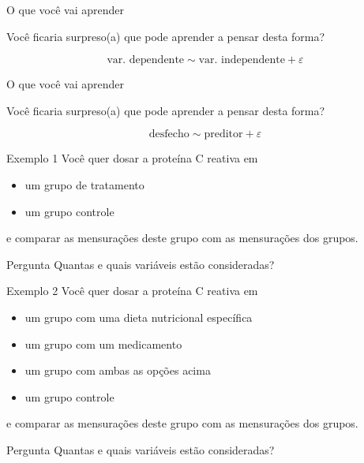 \documentclass{beamer}
\begin{document}
\begin{frame}{O que você vai aprender}
  \begin{block}{}
    Você ficaria surpreso(a) que pode aprender a pensar desta forma?
  \end{block}

  $$\text{var. dependente} \sim \text{var. independente} + \varepsilon$$
\end{frame}

\begin{frame}{O que você vai aprender}
  \begin{block}{}
    Você ficaria surpreso(a) que pode aprender a pensar desta forma?
  \end{block}

  $$\text{desfecho} \sim \text{preditor} + \varepsilon$$
\end{frame}

\begin{frame}{}
  \begin{exampleblock}{Exemplo 1}
    Você quer dosar a proteína C reativa em
    \begin{itemize}
    \item um grupo de tratamento
    \item um grupo controle
    \end{itemize}
    e comparar as mensurações deste grupo com as mensurações dos grupos.
  \end{exampleblock}
  \begin{block}{Pergunta}
    Quantas e quais variáveis estão consideradas?
  \end{block}
\end{frame}

\begin{frame}{}
  \begin{exampleblock}{Exemplo 2}
    Você quer dosar a proteína C reativa em
    \begin{itemize}
    \item um grupo com uma dieta nutricional específica
    \item um grupo com um medicamento
    \item um grupo com ambas as opções acima
    \item um grupo controle
    \end{itemize}
    e comparar as mensurações deste grupo com as mensurações dos grupos.
  \end{exampleblock}
  \begin{block}{Pergunta}
    Quantas e quais variáveis estão consideradas?
  \end{block}
\end{frame}
\end{document}
